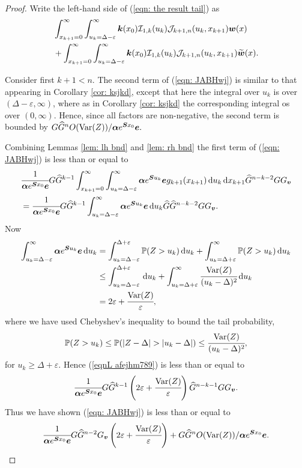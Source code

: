 \begin{proof}
	Write the left-hand side of (\ref{eqn: the result tail}) as 
	\begin{align}
		&\int_{x_{k+1}=0}^\infty \int_{u_k=\Delta-\varepsilon}^\infty \boldsymbol k(x_0)\mathcal I_{1,k}(u_k) \mathcal J_{k+1,n}(u_k,x_{k+1})\boldsymbol w(x) \nonumber 
		\\&{}+ \int_{x_{k+1}=0}^\infty \int_{u_k=\Delta-\varepsilon}^\infty \boldsymbol k(x_0)\mathcal I_{1,k}(u_k) \mathcal J_{k+1,n}(u_k,x_{k+1})\widetilde{\boldsymbol w}(x). \label{eqn: JABHwj}
	\end{align} 
	
	Consider first \(k+1<n\). The second term of (\ref{eqn: JABHwj}) is similar to that appearing in Corollary \ref{cor: ksjkd}, except that here the integral over \(u_k\) is over \((\Delta-\varepsilon,\infty)\), where as in Corollary \ref{cor: ksjkd} the corresponding integral os over \((0,\infty)\). Hence, since all factors are non-negative, the second term is bounded by \(G\widehat G^{n}O(\mathrm{Var}(Z))/\boldsymbol \alpha e^{\boldsymbol{S}x_0}\boldsymbol e.\)

	Combining Lemmas \ref{lem: lh bnd} and \ref{lem: rh bnd} the first term of (\ref{eqn: JABHwj}) is less than or equal to 
	\begin{align}
		&\cfrac{1}{\boldsymbol \alpha e^{\boldsymbol{S} x_0 }\boldsymbol e}G \widehat G^{k-1}
		\int_{x_{k+1}=0}^\infty \int_{u_k=\Delta-\varepsilon}^\infty \boldsymbol \alpha e^{\boldsymbol{S}u_k}\boldsymbol e g_{k+1}(x_{k+1}) \, \mathrm{d} u_k \, \mathrm{d} x_{k+1}\widehat G^{n-k-2} G G_{\boldsymbol v}
		\\&=\cfrac{1}{\boldsymbol \alpha e^{\boldsymbol{S} x_0}\boldsymbol e}G \widehat G^{k-1}  
		\int_{u_k=\Delta-\varepsilon}^\infty \boldsymbol \alpha e^{\boldsymbol{S}u_k}\boldsymbol e \, \mathrm{d} u_k \widehat G \widehat G^{n-k-2} G G_{\boldsymbol v}. \label{eqnL afejhm789}
	\end{align}
	Now 
	\begin{align}
		\int_{u_k=\Delta-\varepsilon}^\infty \boldsymbol \alpha e^{\boldsymbol{S}u_k}\boldsymbol e \, \mathrm{d} u_k &= \int_{u_k=\Delta-\varepsilon}^{\Delta+\varepsilon} \mathbb P(Z> u_k) \, \mathrm{d} u_k + \int_{u_k=\Delta+\varepsilon}^\infty \mathbb P(Z> u_k) \, \mathrm{d} u_k\nonumber
		\\&\leq \int_{u_k=\Delta-\varepsilon}^{\Delta+\varepsilon} \, \mathrm{d} u_k + \int_{u_k=\Delta+\varepsilon}^\infty \cfrac{\mathrm{Var}(Z)}{(u_k-\Delta)^2} \, \mathrm{d} u_k\nonumber
		\\&= 2\varepsilon + \cfrac{\mathrm{Var}(Z)}{\varepsilon},\label{eqn:kdjf55}
	\end{align}
	where we have used Chebyshev's inequality to bound the tail probability, 
	\[\mathbb P(Z> u_k) \leq \mathbb P(|Z-\Delta|> |u_k-\Delta|) \leq \cfrac{\var(Z)}{(u_k-\Delta)^2},\]
	for \(u_k \geq \Delta +\varepsilon\). Hence (\ref{eqnL afejhm789}) is less than or equal to 
	\[\cfrac{1}{\boldsymbol \alpha e^{\boldsymbol{S} x_0}\boldsymbol e}G \widehat G^{k-1}  
		\left(2\varepsilon + \cfrac{\mathrm{Var}(Z)}{\varepsilon}\right) \widehat G^{n-k-1} G G_{\boldsymbol v}.\]
	Thus we have shown (\ref{eqn: JABHwj}) is less than or equal to 
	\[\cfrac{1}{\boldsymbol \alpha e^{\boldsymbol{S} x_0}\boldsymbol e}G \widehat G^{n-2}  G_{\boldsymbol v}
	\left(2\varepsilon + \cfrac{\mathrm{Var}(Z)}{\varepsilon}\right) + G\widehat G^{n}O(\mathrm{Var}(Z))/\boldsymbol \alpha e^{\boldsymbol{S}x_0}\boldsymbol e.\]
	

\end{proof}
